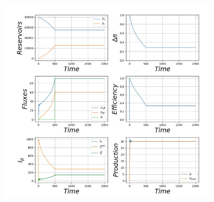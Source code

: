 \documentclass[12pt,a4paper]{article}%
\begin{document}
\begin{appendix}
\begin{figure}[h]
	\includegraphics[width=1.0\textwidth]{figures/Tableau-Bord10.jpg}
	\label{Fig10}
\end{figure} 


\end{appendix}
\end{document}
